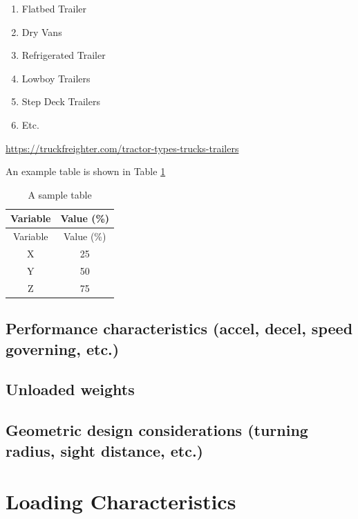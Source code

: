 \documentclass[
]{book}
\providecommand{\tightlist}{%
  \setlength{\itemsep}{0pt}\setlength{\parskip}{0pt}}
\begin{document}
\begin{enumerate}
\def\labelenumi{\arabic{enumi}.}
\tightlist
\item
  Flatbed Trailer
\item
  Dry Vans
\item
  Refrigerated Trailer
\item
  Lowboy Trailers
\item
  Step Deck Trailers
\item
  Etc.
\end{enumerate}

\url{https://truckfreighter.com/tractor-types-trucks-trailers}

An example table is shown in Table \ref{tab:Example}

\begin{longtable}[]{@{}cc@{}}
\caption{\label{tab:Example} A sample table}\tabularnewline
\toprule()
Variable & Value (\%) \\
\midrule()
\endfirsthead
\toprule()
Variable & Value (\%) \\
\midrule()
\endhead
X & 25 \\
Y & 50 \\
Z & 75 \\
\bottomrule()
\end{longtable}

\hypertarget{performance-characteristics-accel-decel-speed-governing-etc.}{%
\section{Performance characteristics (accel, decel, speed governing, etc.)}\label{performance-characteristics-accel-decel-speed-governing-etc.}}

\hypertarget{unloaded-weights}{%
\section{Unloaded weights}\label{unloaded-weights}}

\hypertarget{geometric-design-considerations-turning-radius-sight-distance-etc.}{%
\section{Geometric design considerations (turning radius, sight distance, etc.)}\label{geometric-design-considerations-turning-radius-sight-distance-etc.}}

\hypertarget{loading-characteristics}{%
\chapter{Loading Characteristics}\label{loading-characteristics}}
\end{document}
